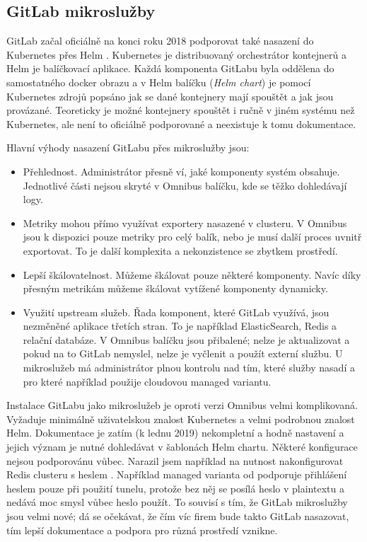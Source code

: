     \subsection{GitLab mikroslužby}
        GitLab začal oficiálně na konci roku 2018 podporovat také nasazení do Kubernetes přes Helm \cite{gitlab-helm-chart}. Kubernetes je distribuovaný orchestrátor kontejnerů a Helm je balíčkovací aplikace. Každá komponenta GitLabu byla oddělena do samostatného docker obrazu a v Helm balíčku (\textit{Helm chart}) je pomocí Kubernetes zdrojů popsáno jak se dané kontejnery mají spouštět a jak jsou provázané. Teoreticky je možné kontejnery spouštět i ručně v jiném systému než Kubernetes, ale není to oficiálně podporované a neexistuje k tomu dokumentace.


        Hlavní výhody nasazení GitLabu přes mikroslužby jsou:
        \begin{itemize}
            \item Přehlednost. Administrátor přesně ví, jaké komponenty systém obsahuje. Jednotlivé části nejsou skryté v Omnibus balíčku, kde se těžko dohledávají logy.
            \item Metriky mohou přímo využívat exportery nasazené v clusteru. V Omnibus jsou k dispozici pouze metriky pro celý balík, nebo je musí další proces uvnitř exportovat. To je další komplexita a nekonzistence se zbytkem prostředí.
            \item Lepší škálovatelnost. Můžeme škálovat pouze některé komponenty. Navíc díky přesným metrikám můžeme škálovat vytížené komponenty dynamicky.
            \item Využití upstream služeb. Řada komponent, které GitLab využívá, jsou nezměněné aplikace třetích stran. To je například ElasticSearch, Redis a relační databáze. V Omnibus balíčku jsou přibalené; nelze je aktualizovat a pokud na to GitLab nemyslel, nelze je vyčlenit a použít externí službu. U mikroslužeb má administrátor plnou kontrolu nad tím, které služby nasadí a pro které například použije cloudovou managed variantu.
        \end{itemize}

        Instalace GitLabu jako mikroslužeb je oproti verzi Omnibus velmi komplikovaná. Vyžaduje minimálně uživatelskou znalost Kubernetes a velmi podrobnou znalost Helm. Dokumentace je zatím (k lednu 2019) nekompletní a hodně nastavení a jejich význam je nutné dohledávat v šablonách Helm chartu. Některé konfigurace nejsou podporovánu vůbec. Narazil jsem například na nutnost nakonfigurovat Redis clusteru s heslem \cite{gitlab-helm-issue-redis}. Například managed varianta od  podporuje přihlášení heslem pouze při použití  tunelu, protože bez něj se posílá heslo v plaintextu a nedává moc smysl vůbec heslo použít. To souvisí s tím, že GitLab mikroslužby jsou velmi nové; dá se očekávat, že čím víc firem bude takto GitLab nasazovat, tím lepší dokumentace a podpora pro různá prostředí vznikne.

